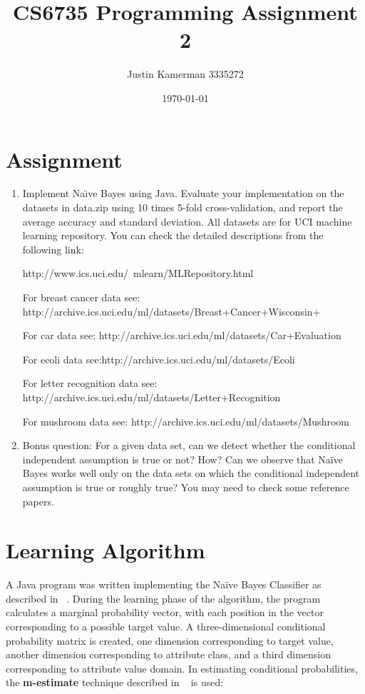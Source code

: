 \documentclass[10pt]{report}
\title{CS6735 Programming Assignment 2}
\author{Justin Kamerman 3335272}
\date{\today}
\begin{document}
\maketitle
\renewcommand*\thesection{\arabic{section}}

\section{Assignment}
\begin{enumerate} 
\item Implement Na\"{\i}ve Bayes using Java. Evaluate your implementation
  on the datasets in data.zip using 10 times 5-fold cross-validation,
  and report the average accuracy and standard deviation. All datasets
  are for UCI machine learning repository. You can check the detailed
  descriptions from the following link: 
 
http://www.ics.uci.edu/~mlearn/MLRepository.html

For breast cancer data see:
http://archive.ics.uci.edu/ml/datasets/Breast+Cancer+Wisconsin+%

For car data see:
http://archive.ics.uci.edu/ml/datasets/Car+Evaluation

For ecoli data see:http://archive.ics.uci.edu/ml/datasets/Ecoli

For letter recognition data see:
http://archive.ics.uci.edu/ml/datasets/Letter+Recognition

For mushroom data see: http://archive.ics.uci.edu/ml/datasets/Mushroom

\item Bonus question: For a given data set, can we detect whether the
  conditional independent assumption is true or not? How? Can we
  observe that Na\"{i}ve Bayes works well only on the data sets on which
  the conditional independent assumption is true or roughly true? You
  may need to check some reference papers. 
\end{enumerate}

\section{Learning Algorithm}
\label{sec:learningalgorithm}

A Java program was written implementing the Na\"{i}ve Bayes Classifier as
described in ~\cite{Mitchell1997}. During the learning phase of the
algorithm, the program calculates a marginal probability vector, with
each position in the vector corresponding to a possible target
value. A three-dimensional conditional probability matrix is
created, one dimension corresponding to target value, another
dimension corresponding to attribute class, and a third dimension
corresponding to attribute value domain. In estimating conditional
probabilities, the \textbf{m-estimate} technique described in
~\cite{Mitchell1997} is used:
\end{document}
